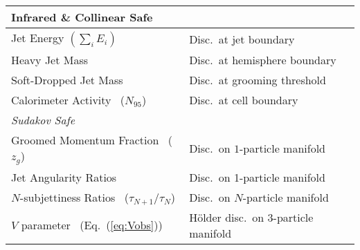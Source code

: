 \documentclass[letterpaper,11pt]{article}
\DeclareRobustCommand{\Eq}[1]{Eq.~(\ref{#1})}
\begin{document}
\begin{table}[p]
\begin{flushright}
\begin{tabular}{p{} p{}}
 \multicolumn{2}{l}{\cellcolor{table_green_bg} \textbf{\textcolor{table_green}{Infrared \& Collinear Safe}}} \\
 \hline
\cellcolor{table_green_bg} Jet Energy $\left(\sum_i E_i \right)$ &\cellcolor{table_green_bg}  Disc.\ at jet boundary\\
\cellcolor{table_green_bg} Heavy Jet Mass~\cite{Clavelli:1981yh} &\cellcolor{table_green_bg}  Disc.\ at hemisphere boundary \\
\cellcolor{table_green_bg} Soft-Dropped Jet Mass~\cite{Dasgupta:2013ihk,Larkoski:2014wba} & \cellcolor{table_green_bg} Disc.\ at grooming threshold\\
\cellcolor{table_green_bg} Calorimeter Activity~\cite{Pumplin:1991kc} ($N_{95}$) & \cellcolor{table_green_bg} Disc.\ at cell boundary\\
  \hline
  \hline
   \multicolumn{2}{l}{\cellcolor{table_green_bg} \textit{\textcolor{table_green}{Sudakov Safe}}} \\
  \hline
\cellcolor{table_green_bg} Groomed Momentum Fraction~\cite{Larkoski:2015lea} ($z_g$) & \cellcolor{table_green_bg} Disc.\ on $1$-particle manifold\\
\cellcolor{table_green_bg} Jet Angularity Ratios~\cite{Larkoski:2013paa} & \cellcolor{table_green_bg} Disc.\ on 1-particle manifold \\
\cellcolor{table_green_bg} $N$-subjettiness Ratios~\cite{Thaler:2010tr,Thaler:2011gf} ($\tau_{N+1} / \tau_{N}$) & \cellcolor{table_green_bg} Disc.\ on $N$-particle manifold\\
\cellcolor{table_green_bg} $V$ parameter~\cite{Banfi:2004yd} (\Eq{eq:Vobs}) & \cellcolor{table_green_bg} H\"{o}lder disc.\ on 3-particle manifold \\
 \hline \hline
\end{tabular}


\end{flushright}
\end{table}
\end{document}
